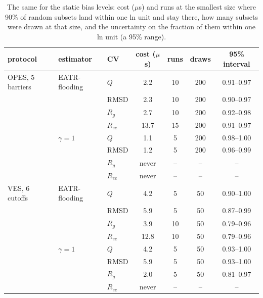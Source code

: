 \begin{table}[H]\centering
\caption{The same for the static bias levels: cost ($\mu$s) and runs at the smallest size where 90\% of random subsets land within one ln unit and stay there, how many subsets were drawn at that size, and the uncertainty on the fraction of them within one ln unit (a 95\% range).}\label{tab:s15b}
\begin{tabular}{lllcccc}\toprule
protocol & estimator & CV & cost ($\mu$s) & runs & draws & 95\% interval\\ \midrule
OPES, 5 barriers & EATR-flooding & $Q$ & 2.2 & 10 & 200 & 0.91--0.97 \\
 &  & RMSD & 2.3 & 10 & 200 & 0.90--0.97 \\
 &  & $R_g$ & 2.7 & 10 & 200 & 0.92--0.98 \\
 &  & $R_{ee}$ & 13.7 & 15 & 200 & 0.91--0.97 \\
 & $\gamma = 1$ & $Q$ & 1.1 & 5 & 200 & 0.98--1.00 \\
 &  & RMSD & 1.2 & 5 & 200 & 0.96--0.99 \\
 &  & $R_g$ & never & -- & -- & -- \\
 &  & $R_{ee}$ & never & -- & -- & -- \\
VES, 6 cutoffs & EATR-flooding & $Q$ & 4.2 & 5 & 50 & 0.90--1.00 \\
 &  & RMSD & 5.9 & 5 & 50 & 0.87--0.99 \\
 &  & $R_g$ & 3.9 & 10 & 50 & 0.79--0.96 \\
 &  & $R_{ee}$ & 12.8 & 10 & 50 & 0.79--0.96 \\
 & $\gamma = 1$ & $Q$ & 4.2 & 5 & 50 & 0.93--1.00 \\
 &  & RMSD & 5.9 & 5 & 50 & 0.93--1.00 \\
 &  & $R_g$ & 2.0 & 5 & 50 & 0.81--0.97 \\
 &  & $R_{ee}$ & never & -- & -- & --\\ \bottomrule
\end{tabular}
\end{table}
